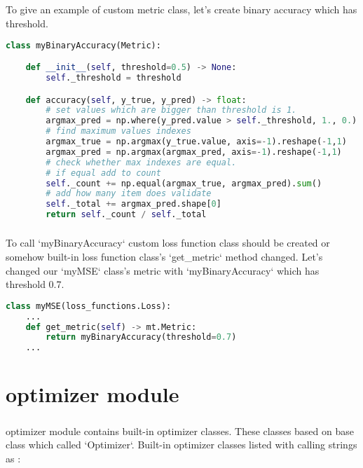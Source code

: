 \documentclass[12pt]{report}
\begin{document}
\paragraph{}
To give an example of custom metric class, let's create binary accuracy which has threshold.


\begin{lstlisting}[language=Python, numbers=none, caption={Custom metric classes.}, label={lis:metric-custom-class}]
class myBinaryAccuracy(Metric):

	def __init__(self, threshold=0.5) -> None: 
		self._threshold = threshold

	def accuracy(self, y_true, y_pred) -> float:
		# set values which are bigger than threshold is 1.
		argmax_pred = np.where(y_pred.value > self._threshold, 1., 0.)
		# find maximum values indexes
		argmax_true = np.argmax(y_true.value, axis=-1).reshape(-1,1)
		argmax_pred = np.argmax(argmax_pred, axis=-1).reshape(-1,1)
		# check whether max indexes are equal. 
		# if equal add to count
		self._count += np.equal(argmax_true, argmax_pred).sum()
		# add how many item does validate
		self._total += argmax_pred.shape[0]
		return self._count / self._total   

\end{lstlisting}

\paragraph{}
To call `myBinaryAccuracy` custom loss function class should be created or somehow built-in loss function class's `get\_metric` method changed. Let's changed our `myMSE` class's metric with `myBinaryAccuracy` which has threshold 0.7.

\begin{lstlisting}[language=Python, numbers=none, caption={Calling custom metric class.}, label={lis:metric-binary-custom-class}]
class myMSE(loss_functions.Loss):
	...
	def get_metric(self) -> mt.Metric:
		return myBinaryAccuracy(threshold=0.7)
	...

\end{lstlisting}






\chapter{optimizer module}
\label{ch:optimizer}

\paragraph{}
optimizer module contains built-in optimizer classes. These classes based on base class which called `Optimizer`. Built-in optimizer classes listed with calling strings as : 
\end{document}
